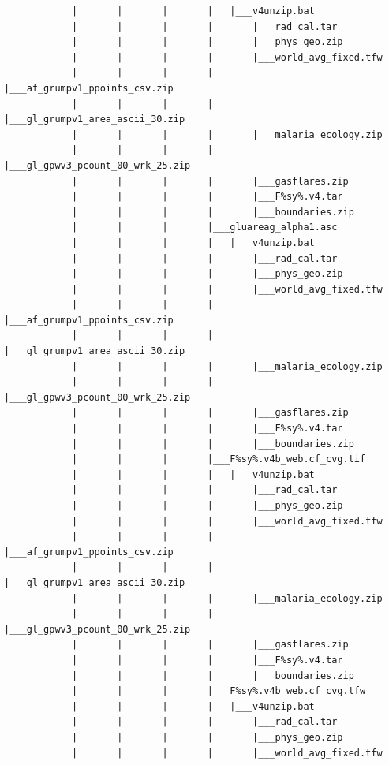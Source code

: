 \documentclass[
]{book}
\begin{document}
\begin{verbatim}
            |       |       |       |   |___v4unzip.bat
            |       |       |       |       |___rad_cal.tar
            |       |       |       |       |___phys_geo.zip
            |       |       |       |       |___world_avg_fixed.tfw
            |       |       |       |       |___af_grumpv1_ppoints_csv.zip
            |       |       |       |       |___gl_grumpv1_area_ascii_30.zip
            |       |       |       |       |___malaria_ecology.zip
            |       |       |       |       |___gl_gpwv3_pcount_00_wrk_25.zip
            |       |       |       |       |___gasflares.zip
            |       |       |       |       |___F%sy%.v4.tar
            |       |       |       |       |___boundaries.zip
            |       |       |       |___gluareag_alpha1.asc
            |       |       |       |   |___v4unzip.bat
            |       |       |       |       |___rad_cal.tar
            |       |       |       |       |___phys_geo.zip
            |       |       |       |       |___world_avg_fixed.tfw
            |       |       |       |       |___af_grumpv1_ppoints_csv.zip
            |       |       |       |       |___gl_grumpv1_area_ascii_30.zip
            |       |       |       |       |___malaria_ecology.zip
            |       |       |       |       |___gl_gpwv3_pcount_00_wrk_25.zip
            |       |       |       |       |___gasflares.zip
            |       |       |       |       |___F%sy%.v4.tar
            |       |       |       |       |___boundaries.zip
            |       |       |       |___F%sy%.v4b_web.cf_cvg.tif
            |       |       |       |   |___v4unzip.bat
            |       |       |       |       |___rad_cal.tar
            |       |       |       |       |___phys_geo.zip
            |       |       |       |       |___world_avg_fixed.tfw
            |       |       |       |       |___af_grumpv1_ppoints_csv.zip
            |       |       |       |       |___gl_grumpv1_area_ascii_30.zip
            |       |       |       |       |___malaria_ecology.zip
            |       |       |       |       |___gl_gpwv3_pcount_00_wrk_25.zip
            |       |       |       |       |___gasflares.zip
            |       |       |       |       |___F%sy%.v4.tar
            |       |       |       |       |___boundaries.zip
            |       |       |       |___F%sy%.v4b_web.cf_cvg.tfw
            |       |       |       |   |___v4unzip.bat
            |       |       |       |       |___rad_cal.tar
            |       |       |       |       |___phys_geo.zip
            |       |       |       |       |___world_avg_fixed.tfw

\end{verbatim}
\end{document}
